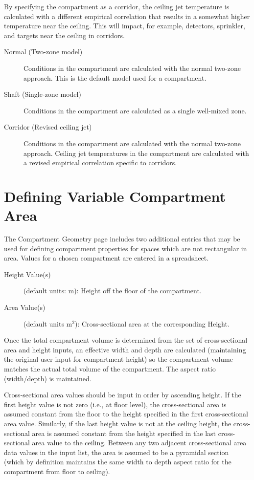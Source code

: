 By specifying the compartment as a corridor, the ceiling jet temperature is calculated with a different empirical correlation that results in a somewhat higher temperature near the ceiling.  This will impact, for example, detectors, sprinkler, and targets near the ceiling in corridors.

\begin{description}
\item[Normal (Two-zone model)] Conditions in the compartment are calculated with the normal two-zone approach. This is the default model used for a compartment.

\item[Shaft (Single-zone model)] Conditions in the compartment are calculated as a single well-mixed zone.

\item[Corridor (Revised ceiling jet)] Conditions in the compartment are calculated with the normal two-zone approach. Ceiling jet temperatures in the compartment are calculated with a revised empirical correlation specific to corridors.
\end{description}




\section{Defining Variable Compartment Area}
\label{info:COMP4}
The Compartment Geometry page includes two additional entries that may be used for defining compartment properties for spaces which are not rectangular in area.  Values for a chosen compartment are entered in a spreadsheet.
\begin{description}
\item[Height Value(s)] (default units: m): Height off the floor of the compartment.
\item[Area Value(s)] (default units m$^2$): Cross-sectional area at the corresponding Height.
\end{description}

Once the total compartment volume is determined from the set of cross-sectional area and height inputs, an effective width and depth are calculated (maintaining the original user input for compartment height) so the compartment volume matches the actual total volume of the compartment. The aspect ratio (width/depth) is maintained.

Cross-sectional area values should be input in order by ascending height. If the first height value is not zero (i.e., at floor level), the cross-sectional area is assumed constant from the floor to the height specified in the first cross-sectional area value.
Similarly, if the last height value is not at the ceiling height, the cross-sectional area is assumed constant from the height specified in the last cross-sectional area value to the ceiling. Between any two adjacent cross-sectional area data values in the input list, the area is assumed to be a pyramidal section (which by definition maintains the same width to depth aspect ratio for the compartment from floor to ceiling).

